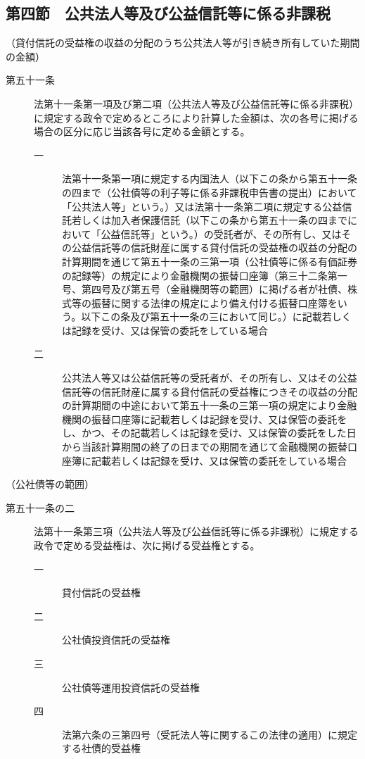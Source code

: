 \documentclass[twocolumn,a4j,10pt]{ltjtarticle}
\begin{document}
\subsection*{第四節　公共法人等及び公益信託等に係る非課税}
\noindent\hspace{10pt}（貸付信託の受益権の収益の分配のうち公共法人等が引き続き所有していた期間の金額）
\begin{description}
\item[第五十一条]法第十一条第一項及び第二項（公共法人等及び公益信託等に係る非課税）に規定する政令で定めるところにより計算した金額は、次の各号に掲げる場合の区分に応じ当該各号に定める金額とする。
\begin{description}
\item[一]法第十一条第一項に規定する内国法人（以下この条から第五十一条の四まで（公社債等の利子等に係る非課税申告書の提出）において「公共法人等」という。）又は法第十一条第二項に規定する公益信託若しくは加入者保護信託（以下この条から第五十一条の四までにおいて「公益信託等」という。）の受託者が、その所有し、又はその公益信託等の信託財産に属する貸付信託の受益権の収益の分配の計算期間を通じて第五十一条の三第一項（公社債等に係る有価証券の記録等）の規定により金融機関の振替口座簿（第三十二条第一号、第四号及び第五号（金融機関等の範囲）に掲げる者が社債、株式等の振替に関する法律の規定により備え付ける振替口座簿をいう。以下この条及び第五十一条の三において同じ。）に記載若しくは記録を受け、又は保管の委託をしている場合
\item[二]公共法人等又は公益信託等の受託者が、その所有し、又はその公益信託等の信託財産に属する貸付信託の受益権につきその収益の分配の計算期間の中途において第五十一条の三第一項の規定により金融機関の振替口座簿に記載若しくは記録を受け、又は保管の委託をし、かつ、その記載若しくは記録を受け、又は保管の委託をした日から当該計算期間の終了の日までの期間を通じて金融機関の振替口座簿に記載若しくは記録を受け、又は保管の委託をしている場合
\end{description}
\end{description}
\noindent\hspace{10pt}（公社債等の範囲）
\begin{description}
\item[第五十一条の二]法第十一条第三項（公共法人等及び公益信託等に係る非課税）に規定する政令で定める受益権は、次に掲げる受益権とする。
\begin{description}
\item[一]貸付信託の受益権
\item[二]公社債投資信託の受益権
\item[三]公社債等運用投資信託の受益権
\item[四]法第六条の三第四号（受託法人等に関するこの法律の適用）に規定する社債的受益権
\end{description}
\end{description}
\end{document}
